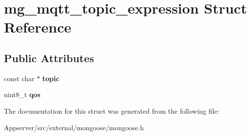 \hypertarget{structmg__mqtt__topic__expression}{}\section{mg\+\_\+mqtt\+\_\+topic\+\_\+expression Struct Reference}
\label{structmg__mqtt__topic__expression}
\subsection*{Public Attributes}
\begin{DoxyCompactItemize}
\item 
const char $\ast$ {\bfseries topic}\hypertarget{structmg__mqtt__topic__expression_a04074697217a1c329b32a9242d63ed8f}{}\label{structmg__mqtt__topic__expression_a04074697217a1c329b32a9242d63ed8f}

\item 
uint8\+\_\+t {\bfseries qos}\hypertarget{structmg__mqtt__topic__expression_a56df5bba82939797c94dd68993b0beff}{}\label{structmg__mqtt__topic__expression_a56df5bba82939797c94dd68993b0beff}

\end{DoxyCompactItemize}


The documentation for this struct was generated from the following file\+:\begin{DoxyCompactItemize}
\item 
Appserver/src/external/mongoose/mongoose.\+h\end{DoxyCompactItemize}
